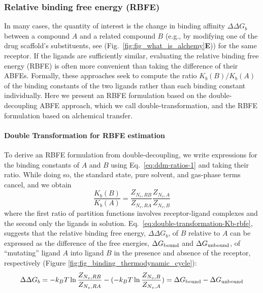 \documentclass[9pt,bestpractices]{livecoms}
\begin{document}
\subsubsection{Relative binding free energy (RBFE)}
\label{sec:theory-rbfe}

In many cases, the quantity of interest is the change in binding affinity $\Delta \Delta G_b$ between a compound $A$ and a related compound $B$ (e.g., by modifying one of the drug scaffold's substituents, see (Fig.~\ref{fig:fig_what_is_alchemy}\textbf{E})) for the same receptor. If the ligands are sufficiently similar, evaluating the relative binding free energy (RBFE) is often more convenient than taking the difference of their ABFEs. Formally, these approaches seek to compute the ratio $K_b(B)/K_b(A)$ of the binding constants of the two ligands rather than each binding constant individually. Here we present an RBFE formulation based on the double-decoupling ABFE approach, which we call double-transformation, and the RBFE formulation based on alchemical transfer.

\paragraph{Double Transformation for RBFE estimation}

To derive an RBFE formulation from double-decoupling, we write expressions for the binding constants of $A$ and $B$ using Eq.~\ref{eq:ddm-ratios-1} and taking their ratio. While doing so, the standard state, pure solvent, and gas-phase terms cancel, and we obtain
\begin{equation}\label{eq:double-transformation-Kb-rbfe}
\frac{K_b(B)}{K_b(A)} = \frac{Z_{N_v,RB}}{Z_{N_v,RA}} \frac{Z_{N_v,A}}{Z_{N_v,B}}
\end{equation}
where the first ratio of partition functions involves receptor-ligand complexes and the second only the ligands in solution. Eq.~\ref{eq:double-transformation-Kb-rbfe}, suggests that the relative binding free energy, $\Delta \Delta G_b$, of $B$ relative to $A$ can be expressed as the difference of the free energies, $\Delta G_{\rm bound}$ and $\Delta G_{\rm unbound}$, of ``mutating'' ligand $A$ into ligand $B$ in the presence and absence of the receptor, respectively (Figure \ref{fig:fig_binding_thermodynamic_cycle}):~\cite{tembre1984ligandreceptor,gilson1997statisticalthermodynamic,mobley2012perspective,cournia2017relative,jiang2019computing, Lee_JChemTheoryComput_2020_v16_p5512}
\begin{equation}\label{eq:double-transformation-dg-rbfe}
\Delta \Delta G_b = -k_B T \ln \frac{Z_{N_v,RB}}{Z_{N_v,RA}} - (-k_B T \ln \frac{Z_{N_v,B}}{Z_{N_v,A}}) = \Delta G_{\rm bound} - \Delta G_{\rm unbound}
\end{equation}
\end{document}
